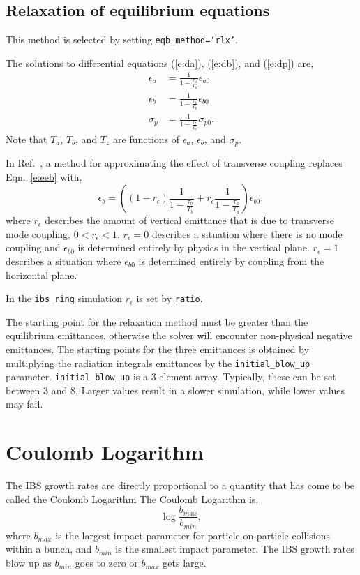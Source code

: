 \documentclass[11pt]{article}
\begin{document}
\subsection{Relaxation of equilibrium equations}
\label{ss:rlx}

This method is selected by setting {\tt eqb_method=`rlx'}.

The solutions to differential equations (\ref{e:da}), (\ref{e:db}), and (\ref{e:dp}) are,
\begin{align}
\epsilon_a&=\frac{1}{1-\frac{\tau_a}{T_a}}\epsilon_{a0}\label{e:eea}\\
\epsilon_b&=\frac{1}{1-\frac{\tau_b}{T_b}}\epsilon_{b0}\label{e:eeb}\\
\sigma_p&=\frac{1}{1-\frac{\tau_z}{T_z}}\sigma_{p0}\label{e:eep}.
\end{align}
Note that $T_a$, $T_b$, and $T_z$ are functions of $\epsilon_a$, $\epsilon_b$, and $\sigma_p$.

In Ref.~\cite{b:wolski}, a method for approximating the effect of 
transverse coupling replaces Eqn.~\ref{e:eeb} with,
\begin{equation}
\epsilon_b=\left(\left(1-r_\epsilon\right)\frac{1}{1-\frac{\tau_b}{T_b}}+
r_\epsilon\frac{1}{1-\frac{\tau_a}{T_a}}\right)\epsilon_{b0},
\end{equation}
where $r_\epsilon$ describes the amount of vertical emittance that is due to transverse mode coupling.
$0<r_\epsilon<1$.
$r_\epsilon=0$ describes a situation where there is no mode coupling and $\epsilon_{b0}$ is
determined entirely by physics in the vertical plane.  $r_\epsilon=1$ describes a situation
where $\epsilon_{b0}$ is determined entirely by coupling from the horizontal plane.

In the {\tt ibs\_ring} simulation $r_\epsilon$ is set by {\tt ratio}.

The starting point for the relaxation method must be greater than the equilibrium emittances,
otherwise the solver will encounter non-physical negative emittances.  The starting points
for the three emittances is obtained by multiplying the radiation integrals emittances by
the {\tt initial_blow_up} parameter.  {\tt initial_blow_up} is a 3-element array.  Typically,
these can be set between $3$ and $8$.  Larger values result in a slower simulation, while lower 
values may fail.

\section{Coulomb Logarithm}
The IBS growth rates are directly proportional to a quantity that has come to be called
the Coulomb Logarithm
The Coulomb Logarithm is,
\begin{equation}
\log\frac{b_{max}}{b_{min}},
\end{equation}
where $b_{max}$ is the largest impact parameter for particle-on-particle collisions
within a bunch, and $b_{min}$ is the smallest impact parameter.  The IBS growth rates
blow up as $b_{min}$ goes to zero or $b_{max}$ gets large.
\end{document}
